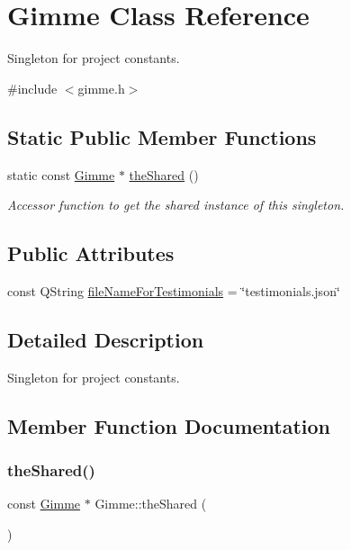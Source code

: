 \hypertarget{class_gimme}{}\section{Gimme Class Reference}
\label{class_gimme}


Singleton for project constants.  




{\ttfamily \#include $<$gimme.\+h$>$}

\subsection*{Static Public Member Functions}
\begin{DoxyCompactItemize}
\item 
static const \mbox{\hyperlink{class_gimme}{Gimme}} $\ast$ \mbox{\hyperlink{class_gimme_a919dd9390c493f42f847039d024f9f80}{the\+Shared}} ()
\begin{DoxyCompactList}\small\item\em Accessor function to get the shared instance of this singleton. \end{DoxyCompactList}\end{DoxyCompactItemize}
\subsection*{Public Attributes}
\begin{DoxyCompactItemize}
\item 
const Q\+String \mbox{\hyperlink{class_gimme_aa9fd95a9aa3dc9734d4f8357c4620efa}{file\+Name\+For\+Testimonials}} = \char`\"{}testimonials.\+json\char`\"{}
\end{DoxyCompactItemize}


\subsection{Detailed Description}
Singleton for project constants. 



\subsection{Member Function Documentation}
\mbox{\label{class_gimme_a919dd9390c493f42f847039d024f9f80}} 
\subsubsection{\texorpdfstring{theShared()}{theShared()}}
{\footnotesize\ttfamily const \mbox{\hyperlink{class_gimme}{Gimme}} $\ast$ Gimme\+::the\+Shared (\begin{DoxyParamCaption}{ }\end{DoxyParamCaption})\hspace{0.3cm}{\ttfamily [static]}}



